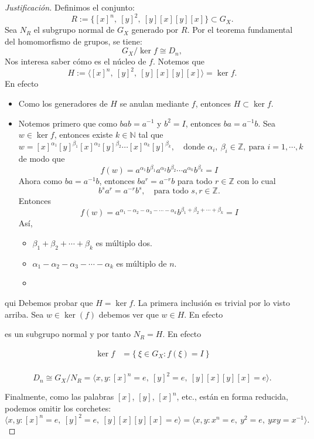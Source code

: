 \begin{proof}[Justificación]
	\medskip
	\noindent
	Definimos el conjunto:
	\[
	R := \{ [x]^n,\ [y]^2,\ [y][x][y][x] \} \subset G_X.
	\] Sea \( N_R \) el subgrupo normal de \( G_X \) generado por \( R \).	Por el teorema fundamental del homomorfismo de grupos, se tiene:
	\[
	G_X / \ker f \cong D_n,
	\]
	Nos interesa saber cómo es el núcleo de $f$. Notemos que $$H:= \langle [x]^n ,\ [y]^2 ,\ [y][x][y][x] \rangle =\ker f.$$ En efecto
	\begin{itemize}
		\item Como los generadores de $H$ se anulan mediante $f$, entonces $H\subset \ker f$.
		\item Notemos primero que como $bab=a^{-1}$ y $b^2=I$, entonces $ba=a^{-1}b$. Sea $w\in \ker f$, entonces existe $k\in \mathbb{N} $ tal que
		\[
		w = [x]^{\alpha_1}[y]^{\beta_1}[x]^{\alpha_2}[y]^{\beta_2} \cdots [x]^{\alpha_k}[y]^{\beta_k}, 
		\quad \text{donde } \alpha_i,\ \beta_i \in \mathbb{Z},\ \text{para } i = 1, \cdots, k
		\] de modo que \[
		f(w) = a^{\alpha_1} b^{\beta_1} a^{\alpha_2} b^{\beta_2} \cdots a^{\alpha_k} b^{\beta_k}=I
		\] Ahora como $ba=a^{-1}b$, entonces $ba^{r}=a^{-r}b$ para todo $r\in \mathbb{Z}$ con lo cual $$b^sa^{r}=a^{-r}b^s,\quad \text{para todo }s,r\in \mathbb{Z}.$$ Entonces
		\[
		f(w) = a^{\alpha_1-\alpha_2-\alpha_3-\cdots-\alpha_k} b^{\beta_1+\beta_2+\cdots+\beta_k}=I
		\]
		Así, \begin{itemize}
			\item $\beta_1+\beta_2+\cdots+\beta_k$ es múltiplo  dos.
			\item $\alpha_1-\alpha_2-\alpha_3-\cdots-\alpha_k$ es múltiplo de $n$. 
			\item 
		\end{itemize}
		
		
	\end{itemize}
	
	
	
	
	
	
	qui
	Debemos probar que $H=\ker f$. La primera inclusión es trivial por lo visto arriba. Sea $w\in \ker(f)$ debemos ver que $w\in H$. En efecto 
	
	
	es un subgrupo normal y por tanto $N_R=H$. En efecto
	
	
	
	
	
	
	
	
	
	
	
	\begin{align*}
		\ker f&=\{\:\xi\in G_X: f\left(\xi\right)=I\:\}\\[4pt]
	\end{align*}
	
	\[
	D_n \cong G_X / N_R = \langle x, y : [x]^n = e,\ [y]^2 = e,\ [y][x][y][x] = e \rangle.
	\]
	
	Finalmente, como las palabras \( [x] \), \( [y] \), \( [x]^n \), etc., están en forma reducida, podemos omitir los corchetes:
	\[
	\langle x, y : [x]^n = e,\ [y]^2 = e,\ [y][x][y][x] = e \rangle = \langle x, y : x^n = e,\ y^2 = e,\ yxy = x^{-1} \rangle.
	\]
\end{proof}
